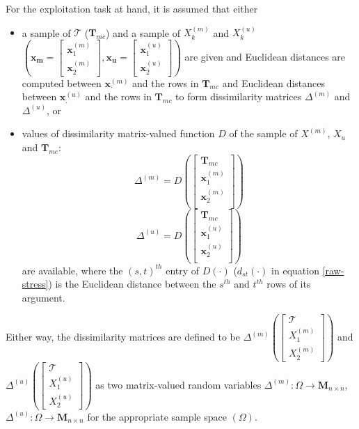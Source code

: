 \documentclass[11pt]{article} %
\begin{document}
For the exploitation task at hand, it is assumed that either
\begin{itemize}
\item   a sample of $\mathcal{T}$ ($\mathbf{T}_{mc}$) and a sample of $X_{k}^{(m)}$ and  $X_{k}^{(u)}$ 
$\left(\bm{x_m}=\left[
 \begin{array}{c}
\bm{x}_{1}^{(m)}\\
\bm{x}_{2}^{(m)}
\end{array}
\right] ,\bm{x_u}=\left[
 \begin{array}{c}
 \bm{x}_{1}^{(u)}\\
 \bm{x}_{2}^{(u)} 
\end{array}
\right]\right)$ are given
 and  Euclidean distances are computed between  $\bm{x}_{\cdot}^{(m)}$ and the rows in  $\mathbf{T}_{mc}$  and Euclidean distances between  $\bm{x}_{.}^{(u)}$ and the rows in  $\mathbf{T}_{mc}$ to form  dissimilarity matrices $\Delta^{(m)}$ and $\Delta^{(u)}$, or
\item  values of  dissimilarity matrix-valued function $D$ of  the sample of $X^{(m)}$, $X_u$ and $\mathbf{T}_{mc}$: $$
\Delta^{(m)}= D \left( \left[
 \begin{array}{c}
\mathbf{T}_{mc}  \\
\bm{x}_{1}^{(m)}\\
\bm{x}_{2}^{(m)}\\
\end{array}
\right]
\right)
$$
$$
\Delta^{(u)}=D \left( \left[
 \begin{array}{c}
\mathbf{T}_{mc}  \\
\bm{x}_{1}^{(u)}\\
\bm{x}_{2}^{(u)}\\
\end{array}
\right]
\right)
$$ are available,
where the  $(s,t)^{th}$ entry of $D(\cdot)$   ($d_{st}(\cdot)$ in equation \eqref{raw-stress})  is the Euclidean distance between the $s^{th}$ and $t^{th}$ rows of its argument.
\end{itemize}

Either way,  the dissimilarity matrices are defined to be $\Delta^{(m)} \left(\left[
\begin{array}{c}
\mathcal{T} \\
X_{1}^{(m)} \\
X_{2}^{(m)} 
\end {array}
\right]
\right)$  and 
 $\Delta^{(u)} \left(\left[
\begin{array}{c}
\mathcal{T}\\
X_{1}^{(u)} \\
X_{2}^{(u)}
\end {array}
\right]\right)$ as two matrix-valued random variables $\Delta^{(m)}:\Omega \rightarrow \mathbf{M}_{n\times n} $,$\Delta^{(u)}:\Omega \rightarrow \mathbf{M}_{n\times n} $  for the appropriate sample  space $(\Omega)$.
\end{document}

